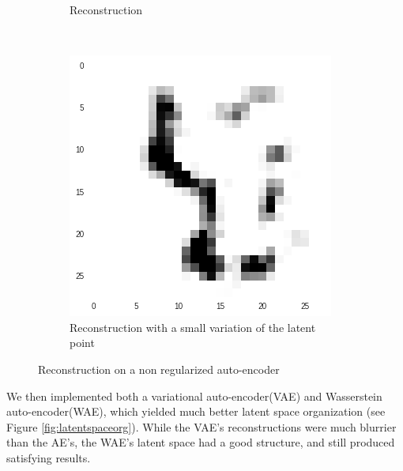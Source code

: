 \documentclass[11pt, english]{article}
\begin{document}
\begin{figure}[h!]
{\begin{subfigure}[t]{.32\linewidth}
    \caption{Reconstruction}
    \end{subfigure}
    ~
    \begin{subfigure}[t]{.32\linewidth}
    \centering \includegraphics[width=\linewidth]{img/alien.png}
    \caption{Reconstruction with a small variation of the latent point}
    \end{subfigure}
    }
    \caption{Reconstruction on a non regularized auto-encoder}
\end{figure}

We then implemented both a variational auto-encoder(VAE) and Wasserstein auto-encoder(WAE), which yielded much better latent space organization (see Figure \ref{fig:latentspaceorg}).
While the VAE's reconstructions were much blurrier than the AE's, the WAE's latent space had a good structure, and still produced satisfying results.
\end{document}
